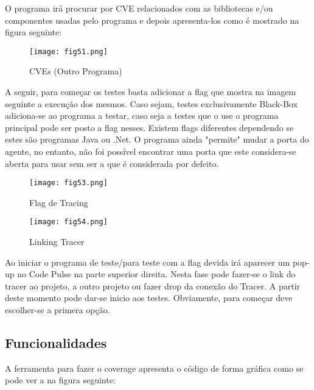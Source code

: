 \par O programa irá procurar por CVE relacionados com as bibliotecas e/ou componentes usadas pelo programa e depois apresenta-los como é mostrado na figura seguinte:
\begin{figure}[H]

  \centering

  \texttt{[image: fig51.png]}

  \caption{CVEs (Outro Programa)}

\end{figure}
A seguir, para começar os testes basta adicionar a flag que mostra na imagem seguinte a execução dos mesmos. Caso sejam, testes exclusivamente Black-Box adiciona-se ao programa a testar, caso seja a testes que o use o programa principal pode ser posto a flag nesses. Existem flags diferentes dependendo se estes são programas Java ou .Net. O programa ainda "permite" mudar a porta do agente, no entanto, não foi possível encontrar uma porta que este considera-se aberta para usar sem ser a que é considerada por defeito.
\begin{figure}[H]

  \centering

  \texttt{[image: fig53.png]}

  \caption{Flag de Tracing}

\end{figure}

\begin{figure}[H]

  \centering

  \texttt{[image: fig54.png]}

  \caption{Linking Tracer}

\end{figure}
\par Ao iniciar o programa de teste/para teste com a flag devida irá aparecer um pop-up no Code Pulse na parte superior direita. Nesta fase pode fazer-se o link do tracer ao projeto, a outro projeto ou fazer drop da conexão do Tracer. A partir deste momento pode dar-se inicio aos testes. Obviamente, para começar deve escolher-se a primera opção.

\subsection{Funcionalidades}

\par A ferramenta para fazer o coverage apresenta o código de forma gráfica como se pode ver a na figura seguinte:

